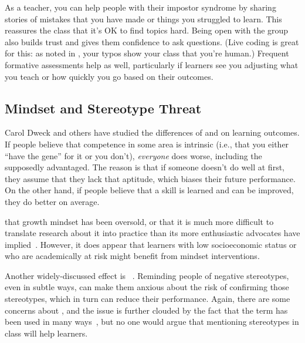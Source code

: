 As a teacher,
you can help people with their impostor syndrome
by sharing stories of mistakes that you have made or things you struggled to learn.
This reassures the class that it's OK to find topics hard.
Being open with the group also builds trust
and gives them confidence to ask questions.
(Live coding is great for this:
as noted in ,
your typos show your class that you're human.)
Frequent formative assessments help as well,
particularly if learners see you adjusting what you teach or how quickly you go
based on their outcomes.

\subsection*{Mindset and Stereotype Threat}

Carol Dweck and others have studied the differences of 
and  on learning outcomes.
If people believe that competence in some area is intrinsic
(i.e., that you either ``have the gene'' for it or you don't),
\emph{everyone} does worse,
including the supposedly advantaged.
The reason is that if someone doesn't do well at first,
they assume that they lack that aptitude,
which biases their future performance.
On the other hand,
if people believe that a skill is learned and can be improved,
they do better on average.

that growth mindset has been oversold,
or that it is much more difficult to translate research about it into practice
than its more enthusiastic advocates have implied~\cite{Sisk2018}.
However,
it does appear that learners with low socioeconomic status or who are academically at risk might benefit from mindset interventions.

Another widely-discussed effect is ~\cite{Stee2011}.
Reminding people of negative stereotypes,
even in subtle ways,
can make them anxious about the risk of confirming those stereotypes,
which in turn can reduce their performance.
Again,
there are some concerns about
,
and the issue is further clouded by the fact that the term has been used in many ways~\cite{Shap2007},
but no one would argue that mentioning stereotypes in class will help learners.

